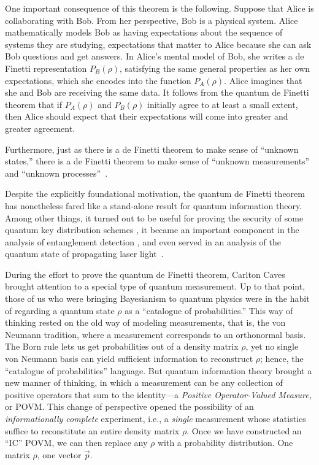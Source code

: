\documentclass[aps,pra,superscriptaddress,12pt,tightenlines,nofootinbib]{revtex4-2}
\begin{document}
One important consequence of this theorem is the following.  Suppose
that Alice is collaborating with Bob.  From her perspective, Bob is a
physical system.  Alice mathematically models Bob as having
expectations about the sequence of systems they are studying,
expectations that matter to Alice because she can ask Bob questions
and get answers.  In Alice's mental model of Bob, she writes a de
Finetti representation $P_B(\rho)$, satisfying the same general
properties as her own expectations, which she encodes into the
function $P_A(\rho)$.  Alice imagines that she and Bob are receiving
the same data.  It follows from the quantum de Finetti theorem that if
$P_A(\rho)$ and $P_B(\rho)$ initially agree to at least a small
extent, then Alice should expect that their expectations will come
into greater and greater agreement.

Furthermore, just as there is a de Finetti theorem to make sense of
``unknown states,'' there is a de Finetti theorem to make sense of
``unknown measurements'' and ``unknown processes''~\cite{Fuchs04c}.

Despite the explicitly foundational motivation, the quantum de Finetti theorem has nonetheless fared like a stand-alone result for quantum information theory.  Among other things, it turned out to be useful for proving the security of some quantum key distribution schemes \cite{Lo05,Renner07,Renner08}, it became an important component in the analysis of entanglement detection \cite{Doherty05,Enk07}, and even served in an analysis of the quantum state of propagating laser light~\cite{vanEnk02,vanEnk02b}.


During the effort to prove the quantum de Finetti theorem, Carlton Caves brought attention to a special type of quantum measurement.  Up to that point, those of us who were bringing Bayesianism to quantum physics were in the habit of regarding a quantum state $\rho$ as a ``catalogue of probabilities.''  This way of thinking rested on the old way of modeling measurements, that is, the von Neumann tradition, where a measurement corresponds to an orthonormal basis.  The Born rule lets us get probabilities out of a density matrix $\rho$, yet no single von Neumann basis can yield sufficient information to reconstruct $\rho$; hence, the ``catalogue of probabilities'' language.  But quantum information theory brought a new manner of thinking, in which a measurement can be any collection of positive operators that sum to the identity---a {\it Positive Operator-Valued Measure,} or POVM.  This change of perspective opened the possibility of an {\it informationally complete\/} experiment, i.e., a {\it single\/} measurement whose statistics suffice to reconstitute an entire density matrix $\rho$.  Once we have constructed an ``IC'' POVM, we can then replace any $\rho$ with a probability distribution.  One matrix $\rho$, one vector $\vec{p}$.
\end{document}
